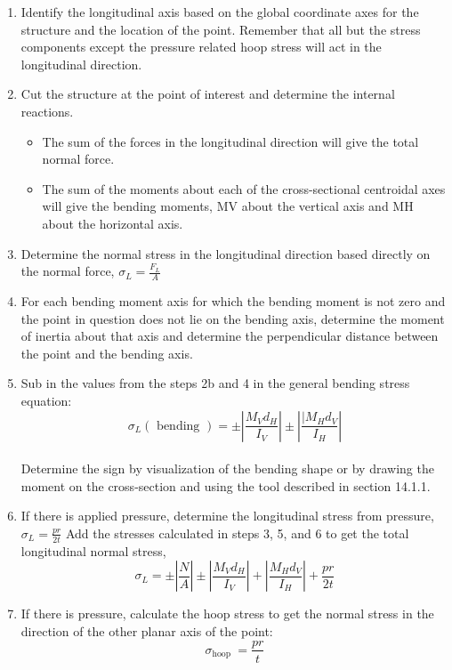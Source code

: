 \documentclass[
  letterpaper,
  DIV=11,
  numbers=noendperiod]{scrreprt}
\begin{document}
\begin{tcolorbox}[enhanced jigsaw, breakable, opacityback=0, toptitle=1mm, left=2mm, colback=white, opacitybacktitle=0.6, colframe=quarto-callout-note-color-frame, titlerule=0mm, arc=.35mm, leftrule=.75mm, bottomtitle=1mm, colbacktitle=quarto-callout-note-color!10!white, rightrule=.15mm, title={Step-by-step: \textbf{Combined normal stress}}, bottomrule=.15mm, toprule=.15mm, coltitle=black]

\begin{enumerate}
\def\labelenumi{\arabic{enumi}.}
\item
  Identify the longitudinal axis based on the global coordinate axes for
  the structure and the location of the point. Remember that all but the
  stress components except the pressure related hoop stress will act in
  the longitudinal direction.
\item
  Cut the structure at the point of interest and determine the internal
  reactions.

  \begin{itemize}
  \item
    The sum of the forces in the longitudinal direction will give the
    total normal force.
  \item
    The sum of the moments about each of the cross-sectional centroidal
    axes will give the bending moments, MV about the vertical axis and
    MH about the horizontal axis.
  \end{itemize}
\item
  Determine the normal stress in the longitudinal direction based
  directly on the normal force, \(\sigma_L=\frac{F_L}{A}\)
\item
  For each bending moment axis for which the bending moment is not zero
  and the point in question does not lie on the bending axis, determine
  the moment of inertia about that axis and determine the perpendicular
  distance between the point and the bending axis.
\item
  Sub in the values from the steps 2b and 4 in the general bending
  stress equation:\\
  \[
  \sigma_L(\text { bending })= \pm\left|\frac{M_V d_H}{I_V}\right| \pm\left|\frac{\mid M_H d_V}{I_H}\right|
  \]\\
  Determine the sign by visualization of the bending shape or by drawing
  the moment on the cross-section and using the tool described in
  section 14.1.1.
\item
  If there is applied pressure, determine the longitudinal stress from
  pressure, \(\sigma_L=\frac{p r}{2 t}\) Add the stresses calculated in
  steps 3, 5, and 6 to get the total longitudinal normal stress,\\
  \[
  \sigma_L= \pm\left|\frac{N}{A}\right| \pm\left|\frac{M_V d_H}{I_V}\right|+\left|\frac{M_H d_V}{I_H}\right|+\frac{p r}{2 t}
  \]
\item
  If there is pressure, calculate the hoop stress to get the normal
  stress in the direction of the other planar axis of the point:\\
  \[
  \sigma_{\text {hoop }}=\frac{p r}{t}
  \]
\end{enumerate}

\end{tcolorbox}
\end{document}
